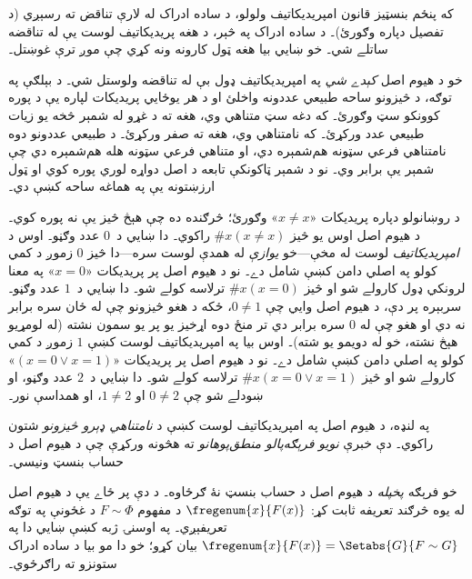 \documentclass[../../../include/open-logic-section]{subfiles}
\begin{document}
که پنځم بنسټيز قانون امپريديکاتيف ولولو، د ساده ادراک له لارې
تناقض ته رسېږي (د تفصيل دپاره  وګورئ)۔
د ساده ادراک په څېر، د هغه پريديکاتيف لوست يې له تناقضه
ساتلے شي۔ خو ښايي بيا هغه ټول کارونه ونه کړي چې موږ ترې غوښتل۔

خو د هيوم اصل \emph{کېدے شي} په امپريديکاتيف ډول بې له تناقضه
ولوستل شي۔ د بېلګې په توګه، د څيزونو ساحه طبيعي عددونه
واخلئ او د هر يوځايي پريديکات لپاره يې د پوره کوونکو سټ
وګورئ۔ که دغه سټ متناهي وي، هغه ته د غړو له شمېر څخه يو
زيات طبيعي عدد ورکړئ۔ که نامتناهي وي، هغه ته صفر ورکړئ۔
د طبيعي عددونو دوه نامتناهي فرعي سټونه هم‌شمېره دي، او
متناهي فرعي سټونه هله هم‌شمېره دي چې شمېر يې برابر وي۔
نو د شمېر ټاکونکې تابعه د اصل دواړه لوري پوره کوي او ټول
ارزښتونه يې په هماغه ساحه کښې دي۔

د روښانولو دپاره پريديکات «$x \neq x$» وګورئ؛ څرګنده ده چې هېڅ
څيز يې نه پوره کوي۔ د هيوم اصل اوس يو څيز $\# x( x\neq x)$
راکوي۔ دا ښايي د~$0$ عدد وګڼو۔ اوس د \emph{امپريديکاتيف} لوست
له مخې---خو \emph{يوازې} له همدې لوست سره---دا څيز $0$ زموږ
د کمي کولو په اصلي دامن کښې شامل دے۔ نو د هيوم اصل پر پريديکات
«$x = 0$» په معنا لرونکي ډول کارولے شو او څيز
$\#x (x = 0)$ ترلاسه کولے شو۔ دا ښايي د~$1$ عدد وګڼو۔ سربېره
پر دې، د هيوم اصل وايي چې $0 \neq 1$، ځکه د هغو څيزونو چې له
ځان سره برابر نه دي او هغو چې له $0$ سره برابر دي تر منځ دوه
اړخيز يو پر يو سمون نشته (له لومړيو هېڅ نشته، خو له دويمو يو
شته)۔ اوس بيا په امپريديکاتيف لوست کښې $1$ زموږ د کمي کولو په
اصلي دامن کښې شامل دے۔ نو د هيوم اصل پر پريديکات
«$(x = 0 \lor x = 1)$» کارولے شو او څيز
$\#x(x = 0 \lor x = 1)$ ترلاسه کولے شو۔ دا ښايي د~$2$ عدد
وګڼو، او ښودلے شو چې $0\neq 2$ او $1 \neq 2$، او همداسې نور۔

په لنډه، د هيوم اصل په امپريديکاتيف لوست کښې د \emph{نامتناهي
ډېرو څيزونو} شتون راکوي۔ دې خبرې \emph{نويو فرېګه‌پالو
منطق‌پوهانو} ته هڅونه ورکړې چې د هيوم اصل د حساب بنسټ ونيسي۔

خو فرېګه \emph{پخپله} د هيوم اصل د حساب بنسټ نۀ ګرځاوه۔ د دې
پر ځاے يې د هيوم اصل له يوه څرګند تعريفه ثابت کړ:
$\fregenum{x}{F(x)}$ د مفهوم $F \sim \Phi$ د غځونې په توګه
تعريفېږي۔ په اوسنۍ ژبه کښې ښايي دا په
$\fregenum{x}{F(x)} = \Setabs{G}{F \sim G}$ بيان کړو؛ خو دا مو
بيا د ساده ادراک ستونزو ته راګرځوي۔
\end{document}
